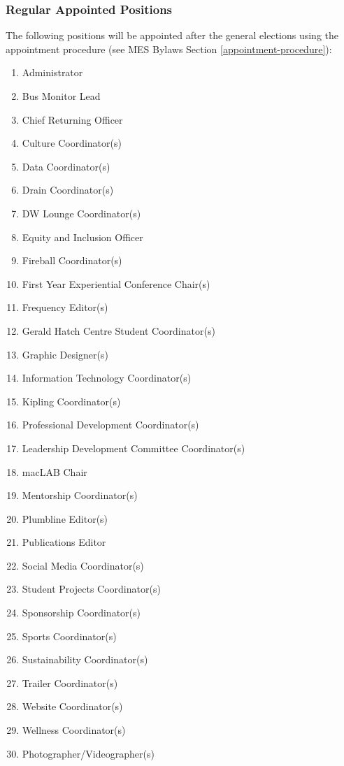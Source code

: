 \subsubsection{Regular Appointed Positions}
\label{regular-appointed-positions}
The following positions will be appointed after the general elections
using the appointment procedure (see MES Bylaws Section \ref{appointment-procedure}): %

\begin{enumerate}
 \item
  Administrator
 \item
  Bus Monitor Lead
 \item
  Chief Returning Officer
 \item
  Culture Coordinator(s)
 \item
  Data Coordinator(s)
 \item
  Drain Coordinator(s)
 \item
  DW Lounge Coordinator(s)
 \item
  Equity and Inclusion Officer
 \item
  Fireball Coordinator(s)
 \item
  First Year Experiential Conference Chair(s)
 \item
  Frequency Editor(s)
 \item
  Gerald Hatch Centre Student Coordinator(s)
 \item
  Graphic Designer(s)
 \item
  Information Technology Coordinator(s)
 \item
  Kipling Coordinator(s)
 \item
  Professional Development Coordinator(s)
 \item
  Leadership Development Committee Coordinator(s)
 \item
  macLAB Chair
 \item
  Mentorship Coordinator(s)
 \item
  Plumbline Editor(s)
 \item
  Publications Editor
 \item
  Social Media Coordinator(s)
 \item
  Student Projects Coordinator(s)
 \item
  Sponsorship Coordinator(s)
 \item
  Sports Coordinator(s)
 \item
  Sustainability Coordinator(s)
 \item
  Trailer Coordinator(s)
 \item
  Website Coordinator(s)
 \item
  Wellness Coordinator(s)
 \item
  Photographer/Videographer(s)
\end{enumerate}

